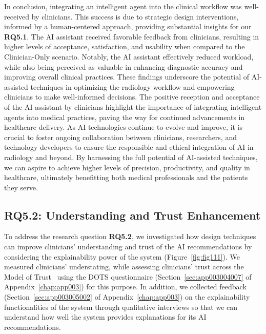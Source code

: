 In conclusion, integrating an intelligent agent into the clinical workflow was well-received by clinicians.
This success is due to strategic design interventions, informed by a human-centered approach, providing substantial insights for our {\bf RQ5.1}.
The \ac{AI} assistant received favorable feedback from clinicians, resulting in higher levels of acceptance, satisfaction, and usability when compared to the Clinician-Only scenario.
Notably, the \ac{AI} assistant effectively reduced workload, while also being perceived as valuable in enhancing diagnostic accuracy and improving overall clinical practices.
These findings underscore the potential of \ac{AI}-assisted techniques in optimizing the radiology workflow and empowering clinicians to make well-informed decisions.
The positive reception and acceptance of the \ac{AI} assistant by clinicians highlight the importance of integrating intelligent agents into medical practices, paving the way for continued advancements in healthcare delivery.
As \ac{AI} technologies continue to evolve and improve, it is crucial to foster ongoing collaboration between clinicians, researchers, and technology developers to ensure the responsible and ethical integration of \ac{AI} in radiology and beyond.
By harnessing the full potential of \ac{AI}-assisted techniques, we can aspire to achieve higher levels of precision, productivity, and quality in healthcare, ultimately benefitting both medical professionals and the patients they serve.

\subsection{RQ5.2: Understanding and Trust Enhancement}
\label{sec:chap005006002}

To address the research question {\bf RQ5.2}, we investigated how design techniques can improve clinicians' understanding and trust of the \ac{AI} recommendations by considering the explainability power of the system (Figure~\ref{fig:fig111}).
We measured clinicians' understating, while assessing clinicians' trust across the Model of Trust~\cite{CALISTO2021102607} using the \ac{DOTS} questionnaire (Section~\ref{sec:app003004007} of Appendix~\ref{chap:app003}) for this purpose.
In addition, we collected feedback (Section~\ref{sec:app003005002} of Appendix~\ref{chap:app003}) on the explainability functionalities of the system through qualitative interviews so that we can understand how well the system provides explanations for its \ac{AI} recommendations.


